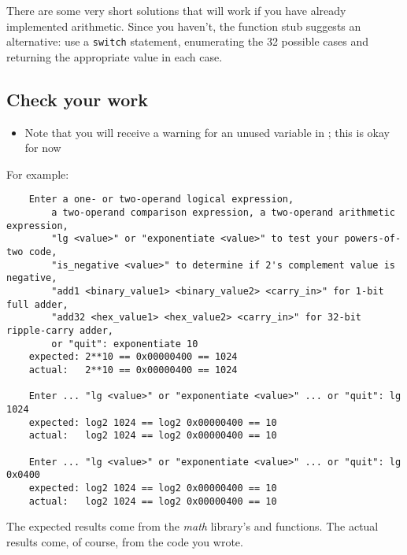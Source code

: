 There are some very short solutions that will work if you have already implemented arithmetic.
Since you haven't, the function stub suggests an alternative:
use a \lstinline{switch} statement, enumerating the 32 possible cases and returning the appropriate value in each case.

\begin{description}
\end{description}


\subsection*{Check your work}

\begin{description}
        \begin{itemize}
            \item Note that you will receive a warning for an unused variable in ;
                this is okay for now
        \end{itemize}
\end{description}
For example:
\begin{verbatim}
    Enter a one- or two-operand logical expression,
        a two-operand comparison expression, a two-operand arithmetic expression,
        "lg <value>" or "exponentiate <value>" to test your powers-of-two code,
        "is_negative <value>" to determine if 2's complement value is negative,
        "add1 <binary_value1> <binary_value2> <carry_in>" for 1-bit full adder,
        "add32 <hex_value1> <hex_value2> <carry_in>" for 32-bit ripple-carry adder,
        or "quit": exponentiate 10
    expected: 2**10 == 0x00000400 == 1024
    actual:   2**10 == 0x00000400 == 1024

    Enter ... "lg <value>" or "exponentiate <value>" ... or "quit": lg 1024
    expected: log2 1024 == log2 0x00000400 == 10
    actual:   log2 1024 == log2 0x00000400 == 10

    Enter ... "lg <value>" or "exponentiate <value>" ... or "quit": lg 0x0400
    expected: log2 1024 == log2 0x00000400 == 10
    actual:   log2 1024 == log2 0x00000400 == 10
\end{verbatim}

The expected results come from the \textit{math} library's  and  functions.
The actual results come, of course, from the code you wrote.

